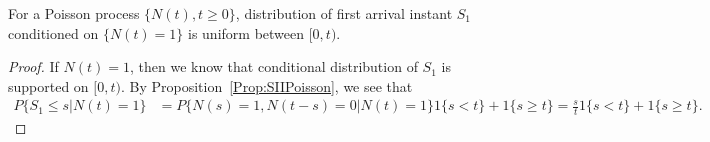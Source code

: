\documentclass[a4paper,10pt,english]{article}
\begin{document}
\begin{prop} 
For a Poisson process $\{N(t), t\geqslant 0\}$, distribution of first arrival instant $S_1$ conditioned on $\{N(t)=1\}$ is uniform between $[0,t)$.
\end{prop}
\begin{proof} If $N(t) = 1$, then we know that conditional distribution of $S_1$ is supported on $[0,t)$. By Proposition~\ref{Prop:SIIPoisson}, we see that
\begin{align*}
P\{S_1 \leq s | N(t) = 1\} &= P\{ N(s) = 1, N(t-s) = 0 | N(t) = 1\}1{\{s < t\}} + 1\{s \geq t\} = \frac{s}{t}1{\{s < t\}} + 1\{s \geq t\}.
\end{align*}
\end{proof}
\end{document}

